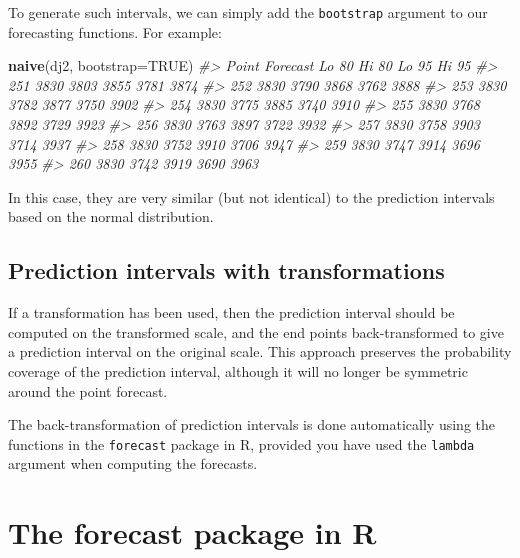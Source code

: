 \documentclass[]{book}
\newenvironment{Shaded}{\begin{snugshade}}{\end{snugshade}}
\newcommand{\CommentTok}[1]{\textcolor[rgb]{0.56,0.35,0.01}{\textit{#1}}}
\newcommand{\DataTypeTok}[1]{\textcolor[rgb]{0.13,0.29,0.53}{#1}}
\newcommand{\KeywordTok}[1]{\textcolor[rgb]{0.13,0.29,0.53}{\textbf{#1}}}
\newcommand{\NormalTok}[1]{#1}
\newcommand{\OtherTok}[1]{\textcolor[rgb]{0.56,0.35,0.01}{#1}}
\begin{document}
To generate such intervals, we can simply add the \texttt{bootstrap} argument to our forecasting functions. For example:

\begin{Shaded}
\begin{Highlighting}[]
\KeywordTok{naive}\NormalTok{(dj2, }\DataTypeTok{bootstrap=}\OtherTok{TRUE}\NormalTok{)}
\CommentTok{#>     Point Forecast Lo 80 Hi 80 Lo 95 Hi 95}
\CommentTok{#> 251           3830  3803  3855  3781  3874}
\CommentTok{#> 252           3830  3790  3868  3762  3888}
\CommentTok{#> 253           3830  3782  3877  3750  3902}
\CommentTok{#> 254           3830  3775  3885  3740  3910}
\CommentTok{#> 255           3830  3768  3892  3729  3923}
\CommentTok{#> 256           3830  3763  3897  3722  3932}
\CommentTok{#> 257           3830  3758  3903  3714  3937}
\CommentTok{#> 258           3830  3752  3910  3706  3947}
\CommentTok{#> 259           3830  3747  3914  3696  3955}
\CommentTok{#> 260           3830  3742  3919  3690  3963}
\end{Highlighting}
\end{Shaded}

In this case, they are very similar (but not identical) to the prediction intervals based on the normal distribution.

\hypertarget{prediction-intervals-with-transformations}{%
\subsection*{Prediction intervals with transformations}\label{prediction-intervals-with-transformations}}

If a transformation has been used, then the prediction interval should be computed on the transformed scale, and the end points back-transformed to give a prediction interval on the original scale. This approach preserves the probability coverage of the prediction interval, although it will no longer be symmetric around the point forecast.

The back-transformation of prediction intervals is done automatically using the functions in the \texttt{forecast} package in R, provided you have used the \texttt{lambda} argument when computing the forecasts.

\hypertarget{the-forecast-package-in-r}{%
\section{The forecast package in R}\label{the-forecast-package-in-r}}
\end{document}
